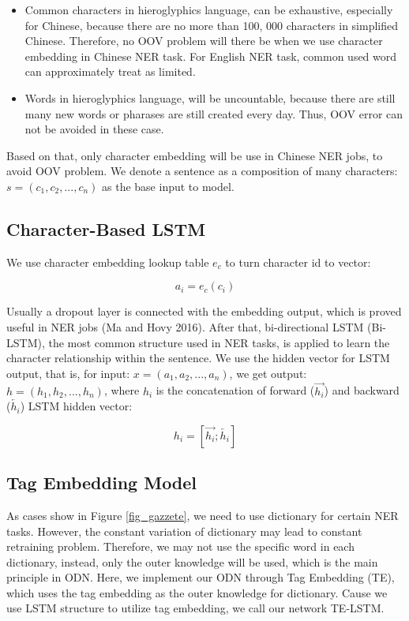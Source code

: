 \documentclass[letterpaper]{article} %
\begin{document}
\begin{itemize}
\item Common characters in hieroglyphics language, can be exhaustive, especially for Chinese, because there are no more than 100, 000 characters in simplified Chinese. Therefore, no OOV problem will there be when we use character embedding in Chinese NER task. For English NER task, common used word can approximately treat as limited.
\item Words in hieroglyphics language, will be uncountable, because there are still many new words or pharases are still created every day. Thus, OOV error can not be avoided in these case.
\end{itemize}

Based on that, only character embedding will be use in Chinese NER jobs, to avoid OOV problem. We denote a sentence as a composition of many characters: $s = (c_1, c_2, ..., c_n)$ as the base input to model.

\subsection{Character-Based LSTM}

We use character embedding lookup table $e_c$ to turn character id to vector:

\begin{equation}
a_i = e_c(c_i) \label{char_embedding}
\end{equation}

Usually a dropout layer is connected with the embedding output, which is proved useful in NER jobs (Ma and Hovy 2016). After that, bi-directional LSTM (Bi-LSTM), the most common structure used in NER tasks, is applied to learn the character relationship within the sentence. We use the hidden vector for LSTM output, that is, for input: $x = (a_1, a_2, ..., a_n) $,  we get output: $h = (h_1, h_2, ..., h_n)$, where $h_i$ is the concatenation of forward ($\overrightarrow{h_i}$) and backward ($\overleftarrow{h_i}$) LSTM hidden vector:

\begin{equation}
h_i = [\overrightarrow{h_i};\overleftarrow{h_i}] \label{lstm_out}
\end{equation}

\subsection{Tag Embedding Model}

As cases show in Figure \ref{fig_gazzete}, we need to use dictionary for certain NER tasks. However, the constant variation of dictionary may lead to constant retraining problem. Therefore, we may not use the specific word in each dictionary, instead, only the outer knowledge will be used, which is the main principle in ODN. Here, we implement our ODN through Tag Embedding (TE), which uses the tag embedding as the outer knowledge for dictionary. Cause we use LSTM structure to utilize tag embedding, we call our network TE-LSTM.
\end{document}
